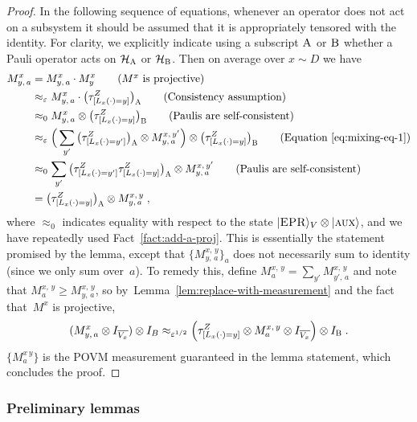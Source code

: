 \documentclass[11pt]{article}
\theoremstyle{definition}
\newcommand{\ket}[1]{|#1\rangle}
\newcommand{\Id}{\ensuremath{I}}
\newcommand{\mH}{\ensuremath{\mathcal{H}}}
\newcommand{\eps}{\varepsilon}
\newcommand{\labelstyle}[1]{\ensuremath{\textsc{#1}}\xspace}
\newcommand{\EPR}{\labelstyle{EPR}}
\newcommand{\aux}{\labelstyle{aux}}
\newcommand{\alice}{\labelstyle{A}}
\newcommand{\bob}{\labelstyle{B}}
\begin{document}
\begin{proof}
	In the following sequence of equations, whenever an operator does not act on a
  subsystem it should be assumed that it is appropriately tensored with the
  identity.
  For clarity, we explicitly indicate using a subscript $\alice$ or $\bob$
  whether a Pauli operator acts on $\mH_\alice$ or $\mH_\bob$.
  Then on average over $x\sim D$ we have
  \begin{align*}
    M^{x}_{y, \, a}
    & =  M^{x}_{y, \, a} \cdot M^{x}_y  \tag{$M^x$ is projective}\\
    & \approx_\eps  M^{x}_{y, \, a} \cdot \big(
      \tau^Z_{[L_x(\cdot)=y]}\big)_\alice
      \tag{Consistency assumption}\\
    & \approx_0 M^x_{y, \, a} \otimes \big(\tau^Z_{[L_x(\cdot)=y]}\big)_\bob
      \tag{Paulis are self-consistent}\\
    & \approx_\eps \Big( \sum_{y'} \big(\tau^Z_{[L_x(\cdot) = y']}\big)_\alice
      \otimes  M^{x,\, y'}_{y,\, a} \Big) \otimes \big(\tau^Z_{[L_x(\cdot)=y]}
      \big)_\bob \tag{Equation~\eqref{eq:mixing-eq-1}}\\
    & \approx_0 \sum_{y'} \big(\tau^Z_{[L_x(\cdot) =
      y']}\tau^Z_{[L_x(\cdot)=y]}\big)_\alice \otimes  M^{x,\, y'}_{y,\, a}
      \tag{Paulis are self-consistent} \\
    & = \big( \tau^Z_{[L_x(\cdot) = y]} \big)_\alice
      \otimes M^{x,\, y}_{y,\, a} \;,
  \end{align*}
  where $\approx_0$ indicates equality with respect to the state $\ket{\EPR}_{V}
  \otimes \ket{\aux}$, and we have repeatedly used Fact~\ref{fact:add-a-proj}.
  This is essentially the statement promised by the lemma, except that
  $\{M^{x,\, y}_{y,\, a}\}_a$ does not necessarily sum to identity (since we
  only sum over~$a$).
  To remedy this, define $M^{x,\, y}_a = \sum_{y'} M^{x,\, y}_{y',\, a}$ and note
  that $M^{x,\, y}_{a} \geq M^{x,\, y}_{y,\, a}$, so
  by~Lemma~\ref{lem:replace-with-measurement} and the fact that~$M^x$ is
  projective,
  \begin{equation}\label{eq:mixing-eq-2}
    (M^{x}_{y,\, a} \otimes \Id_{\overline{V_x}}) \otimes \Id_{B} \approx_{\eps^{1/2}}
    \Bigl(\tau^Z_{[L_x(\cdot) = y]} \otimes M^{x,\, y}_a \otimes \Id_{\overline{V_x}}\Bigr)
    \otimes \Id_\bob\;.
  \end{equation}
  $\{M^{x\,y}_a\}$ is the POVM measurement guaranteed in the lemma statement,
  which concludes the proof.
\end{proof}


\subsubsection{Preliminary lemmas}
\end{document}
